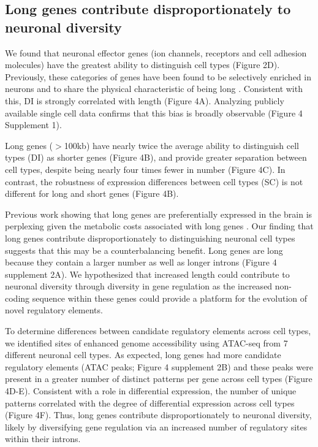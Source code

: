 \subsection{Long genes contribute disproportionately to neuronal diversity}

We found that neuronal effector genes (ion channels, receptors and cell adhesion molecules) have the greatest ability to distinguish cell types (Figure 2D). Previously, these categories of genes have been found to be selectively enriched in neurons and to share the physical characteristic of being long \citep{Sugino_2014,Gabel_2015,Zylka_2015}. Consistent with this, DI is strongly correlated with length (Figure 4A). Analyzing publicly available single cell data confirms that this bias is broadly observable (Figure 4 Supplement 1). 

Long genes ($\gt$100kb) have nearly twice the average ability to distinguish cell types (DI) as shorter genes (Figure 4B), and provide greater separation between cell types, despite being nearly four times fewer in number (Figure 4C). In contrast, the robustness of expression differences between cell types (SC) is not different for long and short genes (Figure 4B). 

Previous work showing that long genes are preferentially expressed in the brain is perplexing given the metabolic costs associated with long genes \cite{Castillo_Davis_2002}. Our finding that long genes contribute disproportionately to distinguishing neuronal cell types suggests that this may be a counterbalancing benefit. Long genes are long because they contain a larger number as well as longer introns (Figure 4 supplement 2A). We hypothesized that increased length could contribute to neuronal diversity through diversity in gene regulation as the increased non-coding sequence within these genes could provide a platform for the evolution of novel regulatory elements.

To determine differences between candidate regulatory elements across cell types, we identified sites of enhanced genome accessibility using ATAC-seq \cite{Buenrostro_2013} from 7 different neuronal cell types. As expected, long genes had more candidate regulatory elements (ATAC peaks; Figure 4 supplement 2B) and these peaks were present in a greater number of distinct patterns per gene across cell types (Figure 4D-E). Consistent with a role in differential expression, the number of unique patterns correlated with the degree of differential expression across cell types (Figure 4F). Thus, long genes contribute disproportionately to neuronal diversity, likely by diversifying  gene regulation via an increased number of regulatory sites within their introns. 


